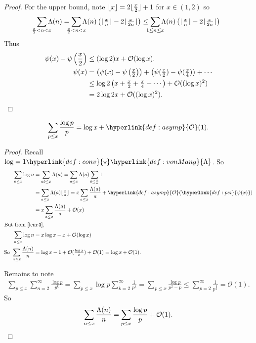 \documentclass{article}
\newcommand{\bigO}{\mathcal{O}}
\DeclarePairedDelimiter\floor{\lfloor}{\rfloor}
\begin{document}
\begin{proof}
  For the upper bound, note $\floor{x} = 2 \floor{\frac{x}{2}} + 1$ for $x \in (1,2)$ so
  \begin{equation*}
    \sum_{\mathclap{\frac{x}{2} < n < x}} \Lambda(n) = \sum_{\mathclap{\frac{x}{2} < n < x}} \Lambda(n) \left(\floor{\tfrac{x}{n}} - 2 \floor{\tfrac{x}{2n}}\right) \leq \sum_{\mathclap{1 \leq n \leq x}} \Lambda(n) \left(\floor{\tfrac{x}{n}} - 2 \floor{\tfrac{x}{2n}}\right)
  \end{equation*}
  Thus
  \begin{align*}
    \psi(x) - \psi\left(\frac{x}{2}\right) &\leq (\log 2) x + \bigO(\log x). \\
    \psi(x) &= \left(\psi(x) - \psi\left(\tfrac{x}{2}\right)\right) + \left(\psi(\tfrac{x}{2}) - \psi(\tfrac{x}{4})\right) + \dotsb  \\
            &\leq \log 2\left(x + \tfrac{x}{2} + \tfrac{x}{4} + \dotsb\right) + \bigO((\log x)^2)\\
    &= 2 \log 2 x + \bigO((\log x)^2). \qedhere
  \end{align*}
\end{proof}
\begin{nlemma}\label{lem:7}
  \begin{equation*}
    \sum_{p \leq x} \frac{\log p}{p} = \log x + \hyperlink{def:asymp}{\bigO}(1).
  \end{equation*}
\end{nlemma}
\begin{proof}
  Recall $\log = 1 \hyperlink{def:conv}{\star} \hyperlink{def:vonMang}{\Lambda}$. So
  \begin{align*}
    \sum_{n \leq x} \log n &= \sum_{ab \leq x} \Lambda(a) = \sum_{a \leq x} \Lambda(a) \sum_{b \leq \frac{x}{a}} 1 \\
                           &= \sum_{a \leq x} \Lambda(a) \floor{\tfrac{x}{a}} = x \sum_{a \leq x} \frac{\Lambda(a)}{a} + \hyperlink{def:asymp}{\bigO}(\hyperlink{def:psi}{\psi(x)}) \\
                           &= x \sum_{a \leq x} \frac{\Lambda(a)}{a} + \bigO(x) \\
  \shortintertext{But from \cref{lem:3},}
    \sum_{n \leq x} \log n &= x \log x - x + \bigO(\log x) \\
    \text{So }\sum_{n \leq x} \frac{\Lambda(n)}{n} &= \log x - 1 + \mathcal{O}(\tfrac{\log x}{x}) + \bigO(1) = \log x + \bigO(1).
  \end{align*}

  Remains to note
  \begin{align*}
    \sum_{p \leq x} \sum_{n=2}^\infty \frac{\log p}{p^k} = \sum_{p \leq x} \log p \sum_{k=2}^\infty \frac{1}{p^k} = \sum_{p \leq x} \frac{\log p}{p^2 - p} \leq \sum_{p=2}^\infty \frac{1}{p^{\frac{3}{2}}} = \bigO(1).
  \end{align*}
  So
  \begin{equation*}\sum_{n \leq x} \frac{\Lambda(n)}n = \sum_{p \leq x} \frac{\log p}{p} + \bigO(1).\qedhere\end{equation*}
\end{proof}
\end{document}
